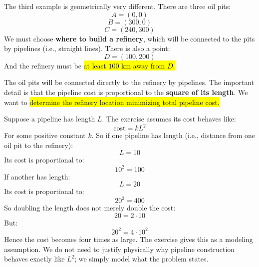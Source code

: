 \begin{examplebox}
    The third example is geometrically very different. There are three oil pits:
    \begin{equation*}
        A=(0,0)
    \end{equation*}
    \begin{equation*}
        B=(300,0)
    \end{equation*}
    \begin{equation*}
        C=(240,300)
    \end{equation*}
    We must choose \textbf{where to build a refinery}, which will be connected to the pits by pipelines (i.e., straight lines). There is also a point:
    \begin{equation*}
        D=(100,200)
    \end{equation*}
    And the refinery must be \hl{at least $100$ km away from $D$.}

    \highspace
    The oil pits will be connected directly to the refinery by pipelines. The important detail is that the pipeline cost is proportional to the \textbf{square of its length}. We want to \hl{determine the refinery location minimizing total pipeline cost.}

    \highspace
    \begin{deepeningbox}
        Suppose a pipeline has length $L$. The exercise assumes its cost behaves like:
        \begin{equation*}
            \text{cost}=kL^2
        \end{equation*}
        For some positive constant $k$. So if one pipeline has length (i.e., distance from one oil pit to the refinery):
        \begin{equation*}
            L=10
        \end{equation*}
        Its cost is proportional to:
        \begin{equation*}
            10^2=100
        \end{equation*}
        If another has length:
        \begin{equation*}
            L=20
        \end{equation*}
        Its cost is proportional to:
        \begin{equation*}
            20^2=400
        \end{equation*}
        So doubling the length does not merely double the cost:
        \begin{equation*}
            20=2\cdot10
        \end{equation*}
        But:
        \begin{equation*}
            20^2=4\cdot10^2
        \end{equation*}
        Hence the cost becomes four times as large. The exercise gives this as a modeling assumption. We do not need to justify physically why pipeline construction behaves exactly like $L^2$; we simply model what the problem states.
    \end{deepeningbox}


\end{examplebox}
